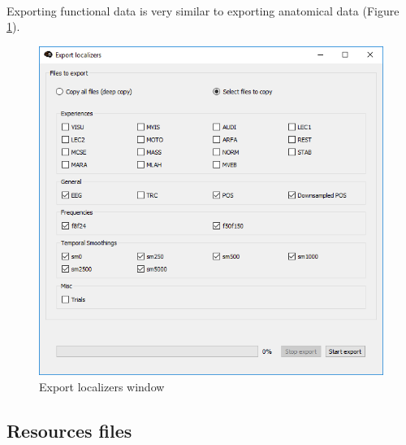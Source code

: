 \documentclass[a4paper]{article}
\begin{document}
\paragraph{} Exporting functional data is very similar to exporting anatomical data (Figure \ref{dbManagerExportLoca}).
\begin{figure}[H]
\begin{center}
\includegraphics[scale=0.5]{ExportLoca.png}
\end{center}
\caption{\label{dbManagerExportLoca}Export localizers window}
\end{figure}
\subsection{Resources files}
\end{document}
